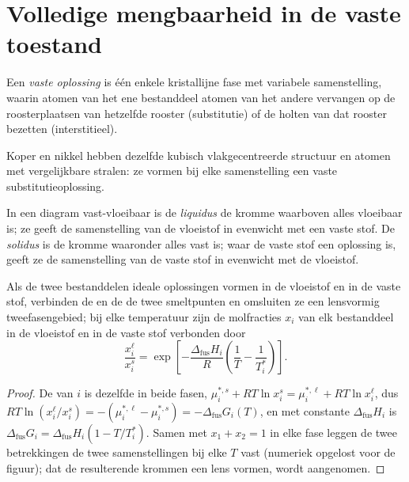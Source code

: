 \section{Volledige mengbaarheid in de vaste toestand}

\begin{definition}\label{def:b2:solid-liquid-diagrams:solid-solution}
Een \emph{vaste oplossing} is één enkele kristallijne fase met
variabele samenstelling, waarin atomen van het ene bestanddeel atomen van het
andere vervangen op de roosterplaatsen van hetzelfde rooster (substitutie) of de holten van
dat rooster bezetten (interstitieel).
\end{definition}

Koper en nikkel hebben dezelfde kubisch vlakgecentreerde structuur en atomen met
vergelijkbare stralen: ze vormen bij elke samenstelling een vaste substitutieoplossing.

\begin{definition}\label{def:b2:solid-liquid-diagrams:liquidus}
In een diagram vast-vloeibaar is de \emph{liquidus} de kromme
waarboven alles vloeibaar is; ze geeft de samenstelling van de vloeistof in
evenwicht met een vaste stof. De \emph{solidus} is de kromme waaronder
alles vast is; waar de vaste stof een oplossing is, geeft ze de
samenstelling van de vaste stof in evenwicht met de vloeistof.
\end{definition}

\begin{proposition}[De lens]\label{prop:b2:solid-liquid-diagrams:lens}
Als de twee bestanddelen ideale oplossingen vormen in de vloeistof en in de vaste stof,
verbinden de  en de  de twee smeltpunten en omsluiten ze een
lensvormig tweefasengebied; bij elke temperatuur zijn de molfracties $x_i$ van
elk bestanddeel in de vloeistof en in de vaste stof verbonden door
\[
  \frac{x_i^{\ell}}{x_i^{s}} = \exp\left[-\frac{\Delta_{\text{fus}}H_i}{R}\left(\frac1T - \frac1{T_i^*}\right)\right] .
\]
\end{proposition}

\begin{proof}
De  van $i$ is dezelfde in beide fasen, $\mu_i^{*,s} +
RT\ln x_i^s = \mu_i^{*,\ell} + RT\ln x_i^\ell$, dus $RT\ln(x_i^\ell/x_i^s) =
-(\mu_i^{*,\ell} - \mu_i^{*,s}) = -\Delta_{\text{fus}}G_i(T)$, en met constante
$\Delta_{\text{fus}}H_i$ is $\Delta_{\text{fus}}G_i = \Delta_{\text{fus}}H_i(1 - T/T_i^*)$.
Samen met $x_1 + x_2 = 1$ in elke fase leggen de twee betrekkingen de twee
samenstellingen bij elke $T$ vast (numeriek opgelost voor de figuur); dat de
resulterende krommen een lens vormen, wordt aangenomen.
\end{proof}

